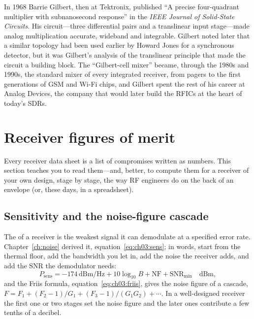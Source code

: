 \begin{history}
In 1968 Barrie Gilbert, then at Tektronix, published ``A precise four-quadrant multiplier with
subnanosecond response'' in the \emph{IEEE Journal of Solid-State Circuits}. His circuit---three
differential pairs and a translinear input stage---made analog multiplication accurate, wideband and
integrable. Gilbert noted later that a similar topology had been used earlier by Howard Jones for a
synchronous detector, but it was Gilbert's analysis of the translinear principle that made the circuit
a building block. The ``Gilbert-cell mixer'' became, through the 1980s and 1990s, the standard mixer
of every integrated receiver, from pagers to the first generations of GSM and Wi-Fi chips, and Gilbert
spent the rest of his career at Analog Devices, the company that would later build the RFICs at the heart
of today's SDRs.
\end{history}

\section{Receiver figures of merit}
\label{sec:ch07:metrics}

Every receiver data sheet is a list of compromises written as numbers. This section teaches you to
read them---and, better, to compute them for a receiver of your own design, stage by stage, the way
RF engineers do on the back of an envelope (or, these days, in a spreadsheet).

\subsection{Sensitivity and the noise-figure cascade}

The  of a receiver is the weakest signal it can demodulate at a specified error
rate. Chapter~\ref{ch:noise} derived it, equation~\eqref{eq:ch03:sens}; in words, start from the thermal
floor, add the bandwidth you let in, add the noise the receiver adds, and add the SNR the demodulator
needs:
\begin{equation}
P_{\text{sens}}=-174\,\text{dBm/Hz}+10\log_{10}B+\text{NF}+\text{SNR}_{\text{min}}\quad\text{dBm},
\label{eq:ch07:sens}
\end{equation}
and the Friis formula, equation~\eqref{eq:ch03:friis}, gives the noise figure of a cascade,
$F=F_1+(F_2-1)/G_1+(F_3-1)/(G_1G_2)+\cdots$. In a well-designed receiver the first one or two stages set
the noise figure and the later ones contribute a few tenths of a decibel.

